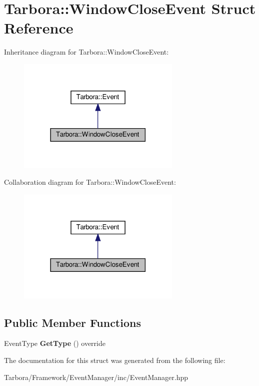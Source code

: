 \hypertarget{structTarbora_1_1WindowCloseEvent}{}\section{Tarbora\+:\+:Window\+Close\+Event Struct Reference}
\label{structTarbora_1_1WindowCloseEvent}


Inheritance diagram for Tarbora\+:\+:Window\+Close\+Event\+:\nopagebreak
\begin{figure}[H]
\begin{center}
\leavevmode
\includegraphics[width=222pt]{structTarbora_1_1WindowCloseEvent__inherit__graph}
\end{center}
\end{figure}


Collaboration diagram for Tarbora\+:\+:Window\+Close\+Event\+:\nopagebreak
\begin{figure}[H]
\begin{center}
\leavevmode
\includegraphics[width=222pt]{structTarbora_1_1WindowCloseEvent__coll__graph}
\end{center}
\end{figure}
\subsection*{Public Member Functions}
\begin{DoxyCompactItemize}
\item 
\mbox{\label{structTarbora_1_1WindowCloseEvent_a216716f1a9524583b06cf22db5170842}} 
Event\+Type {\bfseries Get\+Type} () override
\end{DoxyCompactItemize}


The documentation for this struct was generated from the following file\+:\begin{DoxyCompactItemize}
\item 
Tarbora/\+Framework/\+Event\+Manager/inc/Event\+Manager.\+hpp\end{DoxyCompactItemize}
